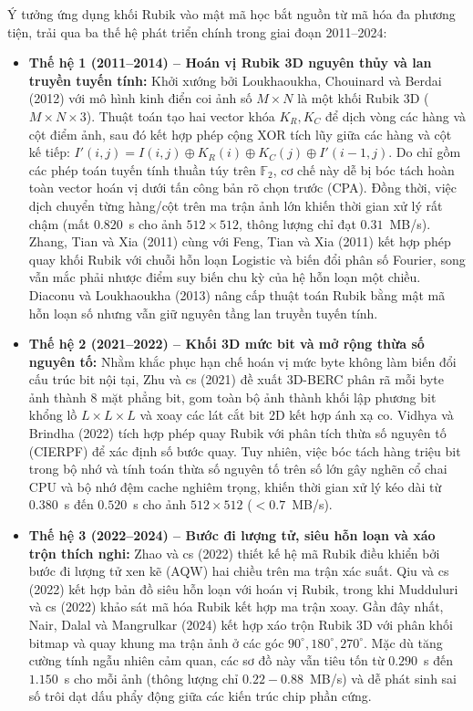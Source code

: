 \documentclass[10pt,twocolumn]{article}
\begin{document}
Ý tưởng ứng dụng khối Rubik vào mật mã học bắt nguồn từ mã hóa đa phương tiện, trải qua ba thế hệ phát triển chính trong giai đoạn 2011--2024:
\begin{itemize}
    \item \textbf{Thế hệ 1 (2011--2014) -- Hoán vị Rubik 3D nguyên thủy và lan truyền tuyến tính:} Khởi xướng bởi Loukhaoukha, Chouinard và Berdai (2012) \cite{loukhaoukha2012rubik} với mô hình kinh điển coi ảnh số $M \times N$ là một khối Rubik 3D ($M \times N \times 3$). Thuật toán tạo hai vector khóa $K_R, K_C$ để dịch vòng các hàng và cột điểm ảnh, sau đó kết hợp phép cộng XOR tích lũy giữa các hàng và cột kế tiếp: $I'(i, j) = I(i, j) \oplus K_R(i) \oplus K_C(j) \oplus I'(i-1, j)$. Do chỉ gồm các phép toán tuyến tính thuần túy trên $\mathbb{F}_2$, cơ chế này dễ bị bóc tách hoàn toàn vector hoán vị dưới tấn công bản rõ chọn trước (CPA). Đồng thời, việc dịch chuyển từng hàng/cột trên ma trận ảnh lớn khiến thời gian xử lý rất chậm (mất $0.820$~s cho ảnh $512 \times 512$, thông lượng chỉ đạt $0.31$~MB/s). Zhang, Tian và Xia (2011) \cite{zhang2011rubik} cùng với Feng, Tian và Xia (2011) \cite{feng2011cisp} kết hợp phép quay khối Rubik với chuỗi hỗn loạn Logistic và biến đổi phân số Fourier, song vẫn mắc phải nhược điểm suy biến chu kỳ của hệ hỗn loạn một chiều. Diaconu và Loukhaoukha (2013) \cite{diaconu2013rubik} nâng cấp thuật toán Rubik bằng mật mã hỗn loạn số nhưng vẫn giữ nguyên tầng lan truyền tuyến tính.
    \item \textbf{Thế hệ 2 (2021--2022) -- Khối 3D mức bit và mở rộng thừa số nguyên tố:} Nhằm khắc phục hạn chế hoán vị mức byte không làm biến đổi cấu trúc bit nội tại, Zhu và cs (2021) \cite{zhu2021berc} đề xuất 3D-BERC phân rã mỗi byte ảnh thành 8 mặt phẳng bit, gom toàn bộ ảnh thành khối lập phương bit khổng lồ $L \times L \times L$ và xoay các lát cắt bit 2D kết hợp ánh xạ co. Vidhya và Brindha (2022) \cite{vidhya2022cierpf} tích hợp phép quay Rubik với phân tích thừa số nguyên tố (CIERPF) để xác định số bước quay. Tuy nhiên, việc bóc tách hàng triệu bit trong bộ nhớ và tính toán thừa số nguyên tố trên số lớn gây nghẽn cổ chai CPU và bộ nhớ đệm cache nghiêm trọng, khiến thời gian xử lý kéo dài từ $0.380$~s đến $0.520$~s cho ảnh $512 \times 512$ ($< 0.7$~MB/s).
    \item \textbf{Thế hệ 3 (2022--2024) -- Bước đi lượng tử, siêu hỗn loạn và xáo trộn thích nghi:} Zhao và cs (2022) \cite{zhao2022quantum} thiết kế hệ mã Rubik điều khiển bởi bước đi lượng tử xen kẽ (AQW) hai chiều trên ma trận xác suất. Qiu và cs (2022) \cite{qiu2022hyperchaotic} kết hợp bản đồ siêu hỗn loạn với hoán vị Rubik, trong khi Mudduluri và cs (2022) \cite{mudduluri2022rubik} khảo sát mã hóa Rubik kết hợp ma trận xoay. Gần đây nhất, Nair, Dalal và Mangrulkar (2024) \cite{nair2024rubik} kết hợp xáo trộn Rubik 3D với phân khối bitmap và quay khung ma trận ảnh ở các góc $90^\circ, 180^\circ, 270^\circ$. Mặc dù tăng cường tính ngẫu nhiên cảm quan, các sơ đồ này vẫn tiêu tốn từ $0.290$~s đến $1.150$~s cho mỗi ảnh (thông lượng chỉ $0.22 - 0.88$~MB/s) và dễ phát sinh sai số trôi dạt dấu phẩy động giữa các kiến trúc chip phần cứng.
\end{itemize}
\end{document}
